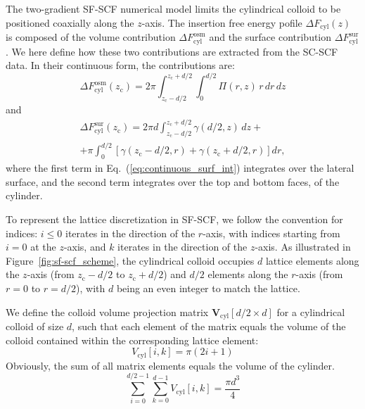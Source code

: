 \documentclass[10pt, a4paper]{article}
\begin{document}
\begin{multicols}{2}

The two-gradient SF-SCF numerical model limits the cylindrical colloid to be positioned coaxially along the $z$-axis.
The insertion free energy pofile $\Delta F_{\text{cyl}}(z)$ is composed of the volume contribution $\Delta F_{\text{cyl}}^{\text{osm}}$ and the surface contribution $\Delta F_{\text{cyl}}^{\text{sur}}$.
We here define how these two contributions are extracted from the SC-SCF data.
In their continuous form, the contributions are:
\begin{equation}
    \Delta F_{\text{cyl}}^{\text{osm}}(z_{\text{c}}) = 2 \pi \int_{z_{\text{c}} - d/2}^{z_{\text{c}} + d/2} \int_{0}^{d/2} \Pi(r,z) \, r \, dr \, dz
\end{equation}
and
\begin{equation}\label{eq:continuous_surf_int}
    \begin{aligned}
        \Delta F_{\text{cyl}}^{\text{sur}}(z_{\text{c}}) = 2 \pi d \int_{z_{\text{c}} - d/2}^{z_{\text{c}} + d/2} \gamma(d/2,z) \, dz +\\
        + \pi \int_{0}^{d/2} \left[ \gamma(z_{\text{c}} - d/2, r) + \gamma(z_{\text{c}} + d/2,r) \right] dr,
    \end{aligned}
\end{equation}
where the first term in Eq.~(\ref{eq:continuous_surf_int}) integrates over the lateral surface, and the second term integrates over the top and bottom faces, of the cylinder.

To represent the lattice discretization in SF-SCF, we follow the convention for indices: $i \le 0$ iterates in the direction of the $r$-axis, with indices starting from $i=0$ at the $z$-axis, and $k$ iterates in the direction of the $z$-axis.
As illustrated in Figure~\ref{fig:sf-scf_scheme}, the cylindrical colloid occupies $d$ lattice elements along the $z$-axis (from $z_{\text{c}} - d/2$ to $z_{\text{c}} + d/2$) and $d/2$ elements along the $r$-axis (from $r = 0$ to $r = d/2$), with $d$ being an even integer to match the lattice.

We define the colloid volume projection matrix $\mathbf{V}_{\text{cyl}}[d/2 \times d]$ for a cylindrical colloid of size $d$, such that each element of the matrix equals the volume of the colloid contained within the corresponding lattice element:
\begin{equation}
    V_{\text{cyl}}[i, k] = \pi(2i + 1)
\end{equation}
Obviously, the sum of all matrix elements equals the volume of the cylinder.
\begin{equation}
    \sum_{i=0}^{d/2 - 1} \sum_{k=0}^{d - 1} V_{\text{cyl}}[i, k] = \frac{\pi d^3}{4}
\end{equation}


\end{multicols}
\end{document}
